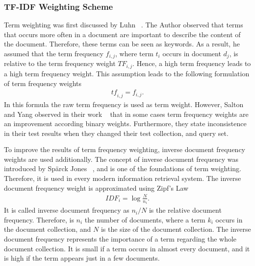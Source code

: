 \subsubsection{TF-IDF Weighting Scheme}
\label{sec:tfidf}

Term weighting was first discussed by Luhn ~\cite{Luhn_statistical-1957}. The Author observed that terms that occurs more often in a document are important to describe the content of the document. Therefore, these terms can be seen as keywords. As a result, he assumed that the term frequency $f_{i, j}$, where term $t_i$ occurs in document $d_j$, is relative to the term frequency weight $TF_{i, j}$. Hence, a high term frequency leads to a high term frequency weight. This assumption leads to the following formulation of term frequency weights
\begin{align}
  \label{raw_tf}
  \mathit{tf}_{i, j} = f_{i, j}.
\end{align}
In this formula the raw term frequency is used as term weight. However, Salton and Yang observed in their work ~\cite{FT023} that in some cases term frequency weights are an improvement according binary weights. Furthermore, they state inconsistence in their test results when they changed their test collection, and query set.

To improve the results of term frequency weighting, inverse document frequency weights are used additionally. The concept of inverse document frequency was introduced by Spärck Jones ~\cite{jones72astatistical}, and is one of the foundations of term weighting. Therefore, it is used in every modern information retrieval system. The inverse document frequency weight is approximated using Zipf's Law ~\cite{zipf1932selected}
\begin{align}
  \mathit{IDF}_i = \log \frac{N}{n_i}.
\end{align}
It is called inverse document frequency as $n_i/N$ is the relative document frequency. Therefore, is $n_i$ the number of documents, where a term $k_i$ occurs in the document collection, and $N$ is the size of the document collection. The inverse document frequency represents the importance of a term regarding the whole document collection. It is small if a term occurs in almost every document, and it is high if the term appears just in a few documents.


